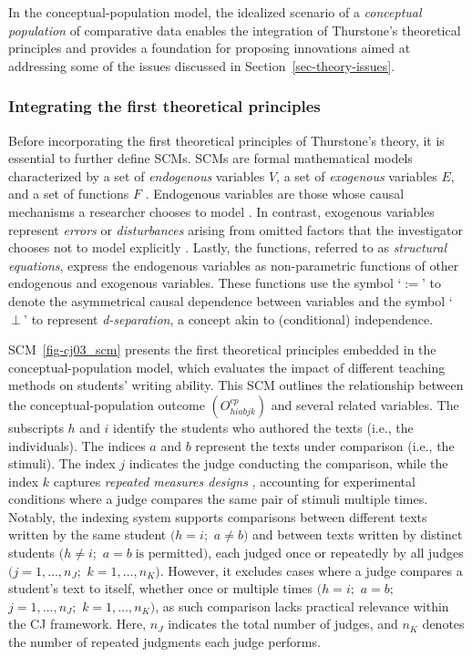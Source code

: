\documentclass[
  authoryear,
  review,
  1p]{elsarticle}
\begin{document}
In the conceptual-population model, the idealized scenario of a
\emph{conceptual population} of comparative data enables the integration
of Thurstone's theoretical principles and provides a foundation for
proposing innovations aimed at addressing some of the issues discussed
in Section~\ref{sec-theory-issues}.

\subsubsection{Integrating the first theoretical
principles}\label{sec-theory-theoretical_P1}

Before incorporating the first theoretical principles of Thurstone's
theory, it is essential to further define SCMs. SCMs are formal
mathematical models characterized by a set of \emph{endogenous}
variables \(V\), a set of \emph{exogenous} variables \(E\), and a set of
functions \(F\) \citep{Pearl_2009, Cinelli_et_al_2020}. Endogenous
variables are those whose causal mechanisms a researcher chooses to
model \citep{Neal_2020}. In contrast, exogenous variables represent
\emph{errors} or \emph{disturbances} arising from omitted factors that
the investigator chooses not to model explicitly
\citep[pp.~27,68]{Pearl_2009}. Lastly, the functions, referred to as
\emph{structural equations}, express the endogenous variables as
non-parametric functions of other endogenous and exogenous variables.
These functions use the symbol `\(:=\)' to denote the asymmetrical
causal dependence between variables and the symbol `\(\:\bot\:\)' to
represent \emph{d-separation}, a concept akin to (conditional)
independence.

SCM~\ref{fig-cj03_scm} presents the first theoretical principles
embedded in the conceptual-population model, which evaluates the impact
of different teaching methods on students' writing ability. This SCM
outlines the relationship between the conceptual-population outcome
\((O^{cp}_{hiabjk})\) and several related variables. The subscripts
\(h\) and \(i\) identify the students who authored the texts (i.e., the
individuals). The indices \(a\) and \(b\) represent the texts under
comparison (i.e., the stimuli). The index \(j\) indicates the judge
conducting the comparison, while the index \(k\) captures \emph{repeated
measures designs} \citep[pp.~366-376]{Lawson_2015}, accounting for
experimental conditions where a judge compares the same pair of stimuli
multiple times. Notably, the indexing system supports comparisons
between different texts written by the same student \((h = i;\)
\(a \neq b)\) and between texts written by distinct students
\((h \neq i;\) \(a = b \; \text{is permitted})\), each judged once or
repeatedly by all judges \((j = 1,\dots,n_{J};\) \(k = 1,\dots,n_K)\).
However, it excludes cases where a judge compares a student's text to
itself, whether once or multiple times \((h = i;\) \(a = b;\)
\(j = 1,\dots,n_{J};\) \(k = 1,\dots,n_{K})\), as such comparison lacks
practical relevance within the CJ framework. Here, \(n_{J}\) indicates
the total number of judges, and \(n_{K}\) denotes the number of repeated
judgments each judge performs.
\end{document}
